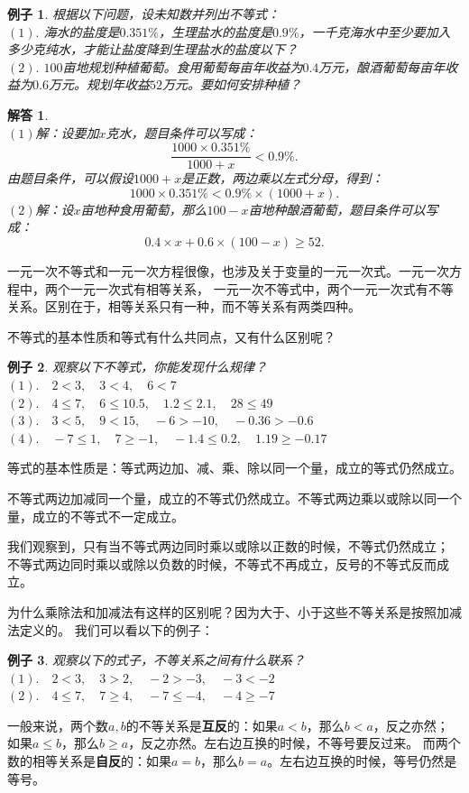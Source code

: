\documentclass[12pt,UTF8]{ctexbook}
\newtheorem{ex}{例子}[section]
\newtheorem*{so}{解答}
\begin{document}
\begin{ex}\label{ex:4-0-0}
    根据以下问题，设未知数并列出不等式：\\
    $(1).$ 海水的盐度是$0.351\%$，生理盐水的盐度是$0.9\%$，一千克海水中至少要加入多少克纯水，才能让盐度降到生理盐水的盐度以下？\\
    $(2).$ $100$亩地规划种植葡萄。食用葡萄每亩年收益为$0.4$万元，酿酒葡萄每亩年收益为$0.6$万元。规划年收益$52$万元。要如何安排种植？
\end{ex}
\begin{so}
    \mbox{} \\
    $(1)$解：设要加$x$克水，题目条件可以写成：
    $$ \frac{1000 \times 0.351\%}{1000 + x} < 0.9\%.$$
    由题目条件，可以假设$1000+x$是正数，两边乘以左式分母，得到：
    $$ 1000 \times 0.351\% < 0.9\% \times (1000 + x).$$
    $(2)$解：设$x$亩地种食用葡萄，那么$100 - x$亩地种酿酒葡萄，题目条件可以写成：
    $$ 0.4 \times x + 0.6 \times (100 - x) \geqslant 52.$$
\end{so}
一元一次不等式和一元一次方程很像，也涉及关于变量的一元一次式。一元一次方程中，两个一元一次式有相等关系，
一元一次不等式中，两个一元一次式有不等关系。区别在于，相等关系只有一种，而不等关系有两类四种。

不等式的基本性质和等式有什么共同点，又有什么区别呢？
\begin{ex}\label{ex:4-0-1}
    观察以下不等式，你能发现什么规律？\\
    $(1).\quad 2 < 3, \quad 3 < 4, \quad 6 < 7$ \\
    $(2). \quad 4 \leqslant 7, \quad 6 \leqslant 10.5, \quad 1.2 \leqslant 2.1, \quad 28 \leqslant 49$ \\
    $(3). \quad 3 < 5, \quad 9 < 15, \quad -6 > -10, \quad -0.36 > -0.6$ \\
    $(4). \quad -7 \leqslant 1, \quad 7 \geqslant -1, \quad -1.4 \leqslant 0.2, \quad 1.19 \geqslant -0.17$ 
\end{ex}

等式的基本性质是：等式两边加、减、乘、除以同一个量，成立的等式仍然成立。

不等式两边加减同一个量，成立的不等式仍然成立。不等式两边乘以或除以同一个量，成立的不等式不一定成立。

我们观察到，只有当不等式两边同时乘以或除以正数的时候，不等式仍然成立；
不等式两边同时乘以或除以负数的时候，不等式不再成立，反号的不等式反而成立。

为什么乘除法和加减法有这样的区别呢？因为大于、小于这些不等关系是按照加减法定义的。
我们可以看以下的例子：
\begin{ex}\label{ex:4-0-2}
    观察以下的式子，不等关系之间有什么联系？\\
    $(1).\quad 2 < 3, \quad 3 > 2, \quad -2 > -3, \quad -3 < -2$ \\
    $(2). \quad 4 \leqslant 7, \quad 7 \geqslant 4, \quad -7 \leqslant -4, \quad -4 \geqslant -7$
\end{ex}
一般来说，两个数$a,b$的不等关系是\textbf{互反}的：如果$a < b$，那么$b < a$，反之亦然；
如果$a \leqslant b$，那么$b \geqslant a$，反之亦然。左右边互换的时候，不等号要反过来。
而两个数的相等关系是\textbf{自反}的：如果$a = b$，那么$b = a$。左右边互换的时候，等号仍然是等号。
\end{document}
